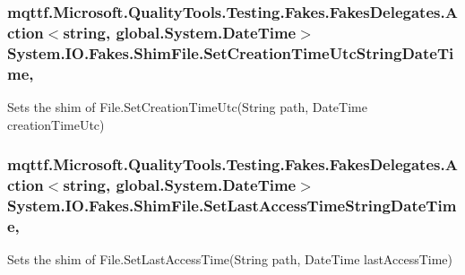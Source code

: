 \hypertarget{class_system_1_1_i_o_1_1_fakes_1_1_shim_file_ac5516c80ba3f7ff75cb43a2bf2fdcd1d}{
\subsubsection[{Set\-Creation\-Time\-Utc\-String\-Date\-Time}]{\setlength{\rightskip}{0pt plus 5cm}mqttf.\-Microsoft.\-Quality\-Tools.\-Testing.\-Fakes.\-Fakes\-Delegates.\-Action$<$string, global.\-System.\-Date\-Time$>$ System.\-I\-O.\-Fakes.\-Shim\-File.\-Set\-Creation\-Time\-Utc\-String\-Date\-Time\hspace{0.3cm}{\ttfamily [static]}, {\ttfamily [set]}}}\label{class_system_1_1_i_o_1_1_fakes_1_1_shim_file_ac5516c80ba3f7ff75cb43a2bf2fdcd1d}


Sets the shim of File.\-Set\-Creation\-Time\-Utc(\-String path, Date\-Time creation\-Time\-Utc)

\hypertarget{class_system_1_1_i_o_1_1_fakes_1_1_shim_file_a00208fb64282781a85202d2d3b6b5db4}{
\subsubsection[{Set\-Last\-Access\-Time\-String\-Date\-Time}]{\setlength{\rightskip}{0pt plus 5cm}mqttf.\-Microsoft.\-Quality\-Tools.\-Testing.\-Fakes.\-Fakes\-Delegates.\-Action$<$string, global.\-System.\-Date\-Time$>$ System.\-I\-O.\-Fakes.\-Shim\-File.\-Set\-Last\-Access\-Time\-String\-Date\-Time\hspace{0.3cm}{\ttfamily [static]}, {\ttfamily [set]}}}\label{class_system_1_1_i_o_1_1_fakes_1_1_shim_file_a00208fb64282781a85202d2d3b6b5db4}


Sets the shim of File.\-Set\-Last\-Access\-Time(\-String path, Date\-Time last\-Access\-Time)

